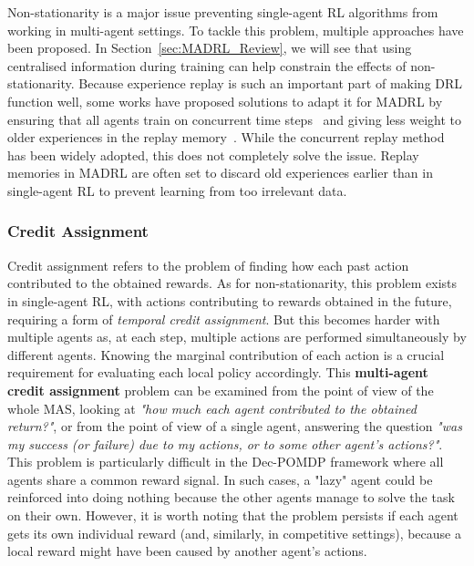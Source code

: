 Non-stationarity is a major issue preventing single-agent RL algorithms from working in multi-agent settings. To tackle this problem, multiple approaches have been proposed. In Section~\ref{sec:MADRL_Review}, we will see that using centralised information during training can help constrain the effects of non-stationarity. Because experience replay is such an important part of making DRL function well, some works have proposed solutions to adapt it for MADRL by ensuring that all agents train on concurrent time steps~\citep{Omidshafiei2017_DecentrMultiTask} and giving less weight to older experiences in the replay memory~\citep{Foerster2017_StabExpReplay}. While the concurrent replay method has been widely adopted, this does not completely solve the issue. Replay memories in MADRL are often set to discard old experiences earlier than in single-agent RL to prevent learning from too irrelevant data.



\subsubsection{Credit Assignment}\label{sec:MAL:CreditAssign}

Credit assignment refers to the problem of finding how each past action contributed to the obtained rewards. As for non-stationarity, this problem exists in single-agent RL, with actions contributing to rewards obtained in the future, requiring a form of \textit{temporal credit assignment}. 
But this becomes harder with multiple agents as, at each step, multiple actions are performed simultaneously by different agents. Knowing the marginal contribution of each action is a crucial requirement for evaluating each local policy accordingly. 
This \textbf{multi-agent credit assignment} problem can be examined from the point of view of the whole MAS, looking at \textit{"how much each agent contributed to the obtained return?"}, or from the point of view of a single agent, answering the question \textit{"was my success (or failure) due to my actions, or to some other agent's actions?"}. 
This problem is particularly difficult in the Dec-POMDP framework where all agents share a common reward signal. In such cases, a "lazy" agent could be reinforced into doing nothing because the other agents manage to solve the task on their own. However, it is worth noting that the problem persists if each agent gets its own individual reward (and, similarly, in competitive settings), because a local reward might have been caused by another agent's actions. 

